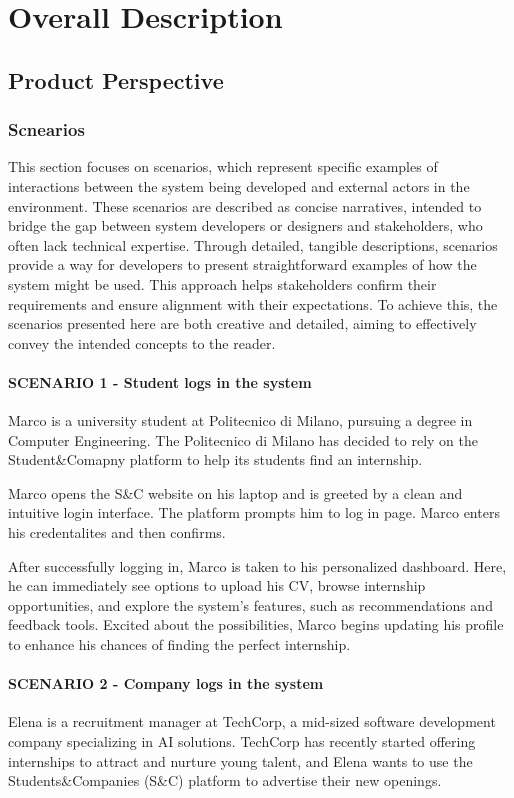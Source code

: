 \chapter{Overall Description}

\section{Product Perspective}
\subsection{Scnearios}
This section focuses on scenarios, which represent specific examples of interactions between
the system being developed and external actors in the environment. These scenarios are described
as concise narratives, intended to bridge the gap between system developers or designers and stakeholders,
who often lack technical expertise. Through detailed, tangible descriptions, scenarios provide a way for
developers to present straightforward examples of how the system might be used. This approach helps
stakeholders confirm their requirements and ensure alignment with their expectations. To achieve this,
the scenarios presented here are both creative and detailed, aiming to effectively convey the intended
concepts to the reader.
\subsubsection{SCENARIO 1 - Student logs in the system}
Marco is a university student at Politecnico di Milano, pursuing a degree in Computer Engineering.
The Politecnico di Milano has decided to rely on the Student\&Comapny platform to help its students
find an internship. 

Marco opens the S\&C website on his laptop and is greeted by a clean and intuitive login interface.
The platform prompts him to log in page. Marco enters his credentalites and then confirms.  

After successfully logging in, Marco is taken to his personalized dashboard. Here, he can immediately
see options to upload his CV, browse internship opportunities, and explore the system's features, such
as recommendations and feedback tools. Excited about the possibilities, Marco begins updating his
profile to enhance his chances of finding the perfect internship.
\subsubsection{SCENARIO 2 - Company logs in the system}
Elena is a recruitment manager at TechCorp, a mid-sized software development company specializing
in AI solutions. TechCorp has recently started offering internships to attract and nurture young talent,
and Elena wants to use the Students\&Companies (S\&C) platform to advertise their new openings.  

